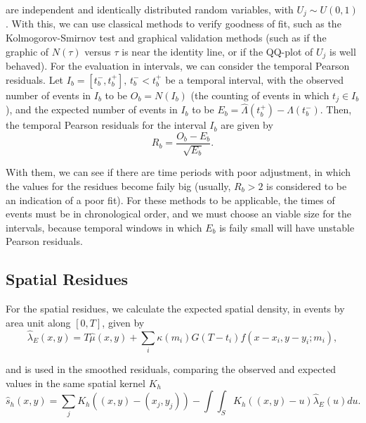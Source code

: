\noindent are independent and identically distributed random variables, with $U_{j} \sim U(0,1)$. With this, we can use classical methods to verify goodness of fit, such as the Kolmogorov-Smirnov test and graphical validation methods (such as if the graphic of $N(\tau)$ versus $\tau$ is near the identity line, or if the QQ-plot of $U_{j}$ is well behaved). For the evaluation in intervals, we can consider the temporal Pearson residuals. Let $I_{b} = [t_{b}^{-}, t_{b}^{+}], \, t_{b}^{-} < t_{b}^{+}$ be a temporal interval, with the observed number of events in $I_{b}$ to be $O_{b} = N(I_{b})$ (the counting of events in which $t_{j} \in I_{b}$), and the expected number of events in $I_{b}$ to be $E_{b} = \hat{\Lambda}(t_{b}^{+}) - \hat{\Lambda}(t_{b}^{-})$. Then, the temporal Pearson residuals for the interval $I_{b}$ are given by
\begin{equation}
  \label{eq-pearson-resid}
  R_{b} = \frac{O_{b} - E_{b}}{\sqrt{E_{b}}}.
\end{equation}

With them, we can see if there are time periods with poor adjustment, in which the values for the residues become faily big (usually, $R_{b} > 2$ is considered to be an indication of a poor fit). For these methods to be applicable, the times of events must be in chronological order, and we must choose an viable size for the intervals, because temporal windows in which $E_{b}$ is faily small will have unstable Pearson residuals.

\subsection{Spatial Residues}
\label{subsec-spatial-resid}

For the spatial residues, we calculate the expected spatial density, in events by area unit along $[0,T]$, given by
\begin{equation}
  \label{eq-expec-spatial-dens}
  \hat{\lambda}_{E}(x,y) = T\hat{\mu}(x,y) + \sum_{i}\kappa(m_{i})G(T - t_{i})f(x - x_{i}, y - y_{i};m_{i}),
\end{equation}

\noindent and is used in the smoothed residuals, comparing the observed and expected values in the same spatial kernel $K_{h}$
\begin{equation}
  \label{eq-smooth-spatial-resid}
  \hat{s}_{h}(x,y) = \sum_{j}K_{h}((x,y) - (x_{j},y_{j})) - \int\int_{S}K_{h}((x,y) - u)\hat{\lambda}_{E}(u)du.
\end{equation}


